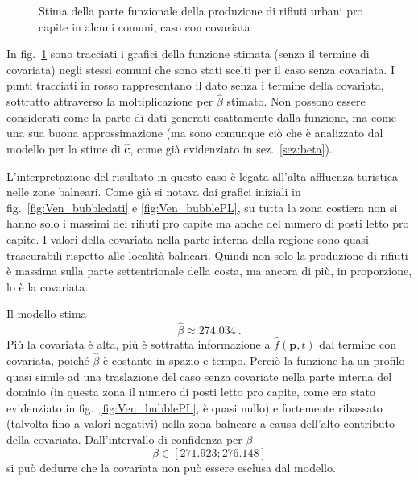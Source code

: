 \documentclass[a4paper,11pt,twoside,openright]{book}							%
\begin{document}
\begin{figure}[t]
{   }
	\caption{Stima della parte funzionale della produzione di rifiuti urbani pro capite in alcuni comuni, caso con covariata}
	\label{fig:Vencovar_tempo}
\end{figure}
\newpage
In fig.~\ref{fig:Vencovar_tempo} sono tracciati i grafici della funzione stimata (senza il termine di covariata) negli stessi comuni che sono stati scelti per il caso senza covariata. I punti tracciati in rosso rappresentano il dato senza i termine della covariata, sottratto attraverso la moltiplicazione per $\hat{\beta}$ stimato. Non possono essere considerati come la parte di dati generati esattamente dalla funzione, ma come una sua buona approssimazione (ma sono comunque ciò che è analizzato dal modello per la stime di $\hat{\bm{c}}$, come già evidenziato in sez.~\ref{sez:beta}).

L'interpretazione del risultato in questo caso è legata all'alta affluenza turistica nelle zone balneari. Come già si notava dai grafici iniziali in fig.~\ref{fig:Ven_bubbledati} e \ref{fig:Ven_bubblePL}, su tutta la zona costiera non si hanno solo i massimi dei rifiuti pro capite ma anche del numero di posti letto pro capite. I valori della covariata nella parte interna della regione sono quasi trascurabili rispetto alle località balneari. Quindi non solo la produzione di rifiuti è massima sulla parte settentrionale della costa, ma ancora di più, in proporzione, lo è la covariata.

Il modello stima
$$
\hat{\beta}\approx274.034 \ .
$$
Più la covariata è alta, più è sottratta informazione a $\hat{f}(\bm p,t)$ dal termine con covariata, poiché $\hat{\beta}$ è costante in spazio e tempo. Perciò la funzione ha un profilo quasi simile ad una traslazione del caso senza covariate nella parte interna del dominio (in questa zona il numero di posti letto pro capite, come era stato evidenziato in fig.~\ref{fig:Ven_bubblePL}, è quasi nullo) e fortemente ribassato (talvolta fino a valori negativi) nella zona balneare a causa dell'alto contributo della covariata. Dall'intervallo di confidenza per $\beta$
$$
\beta \in [271.923;276.148]
$$
si può dedurre che la covariata non può essere esclusa dal modello.
\end{document}
